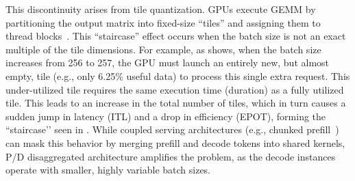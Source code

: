 

This discontinuity arises from tile quantization.
GPUs execute GEMM by partitioning the output matrix into fixed-size ``tiles'' and assigning them to thread blocks~\cite{gemmtile}.
This ``staircase'' effect occurs when the batch size is not an exact multiple of the tile dimensions.
For example, as  shows, when the batch size increases from 256 to 257, the GPU must launch an entirely new, but almost empty, tile (e.g., only 6.25\% useful data) to process this single extra request. 
This under-utilized tile requires the same execution time (duration) as a fully utilized tile. This leads to an increase in the total number of tiles, which in turn causes a sudden jump in latency (ITL) and a drop in efficiency (EPOT), forming the ``staircase’’ seen in .
While coupled serving architectures (e.g., chunked prefill~\cite{agrawal2024taming}) can mask this behavior by merging prefill and decode tokens into shared kernels, P/D disaggregated architecture amplifies the problem, as the decode instances operate with smaller, highly variable batch sizes. 


